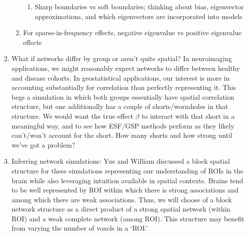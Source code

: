\documentclass[12pt]{article}
\begin{document}
\begin{enumerate}
\begin{enumerate}
\begin{enumerate}
			\item Sharp boundaries vs soft boundaries; thinking about bias, eigenvector approximations, and which eigenvectors are incorporated into models
		\end{enumerate}
		\item For sparse-in-frequency effects, negative eigenvalue vs positive eigenvalue effects
	\end{enumerate}
	\item What if networks differ by group or aren't quite spatial? In neuroimaging applications, we might reasonably expect networks to differ between healthy and disease cohorts. In geostatistical applications, our interest is more in accounting substantially for correlation than perfectly representing it. This begs a simulation in which both groups essentially have spatial correlation structure, but one additionally has a couple of shorts/wormholes in that structure. We would want the true effect $\beta$ to interact with that short in a meaningful way, and to see how ESF/GSP methods perform as they likely can't/won't account for the short. How many shorts and how strong until we've got a problem?
	\item Inferring network simulations: Yue and William discussed a block spatial structure for these simulations representing our understanding of ROIs in the brain while also leveraging intuition available in spatial contexts. Brains tend to be well represented by ROI within which there is strong associations and among which there are weak associations. Thus, we will choose of a block network structure as a direct product of a strong spatial network (within ROI) and a weak complete network (among ROI). This structure may benefit from varying the number of voxels in a `ROI.'
\end{enumerate}
\end{document}
